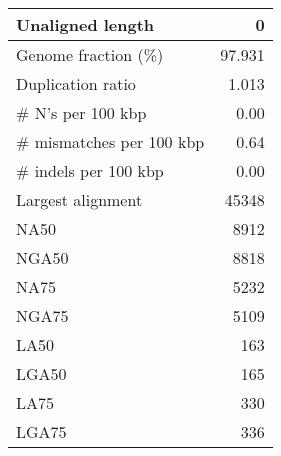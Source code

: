 \documentclass[12pt,a4paper]{article}
\begin{document}
\begin{table}[ht]
\begin{center}
\begin{tabular}{|l*{1}{|r}|}
Unaligned length & 0 \\ \hline
Genome fraction (\%) & 97.931 \\ \hline
Duplication ratio & 1.013 \\ \hline
\# N's per 100 kbp & 0.00 \\ \hline
\# mismatches per 100 kbp & 0.64 \\ \hline
\# indels per 100 kbp & 0.00 \\ \hline
Largest alignment & 45348 \\ \hline
NA50 & 8912 \\ \hline
NGA50 & 8818 \\ \hline
NA75 & 5232 \\ \hline
NGA75 & 5109 \\ \hline
LA50 & 163 \\ \hline
LGA50 & 165 \\ \hline
LA75 & 330 \\ \hline
LGA75 & 336 \\ \hline
\end{tabular}
\end{center}
\end{table}
\end{document}
